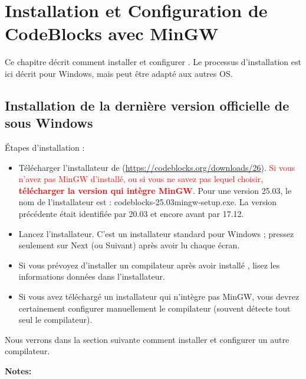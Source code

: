 ﻿\chapter{Installation et Configuration de CodeBlocks avec MinGW}\label{sec:install_codeblocks}

Ce chapitre décrit comment installer et configurer \codeblocks. Le processus d'installation est ici décrit pour Windows, mais peut être adapté aux autres OS.

\section{Installation de la dernière version officielle de \codeblocks sous Windows}
Étapes d'installation :
\begin{itemize}
\item Télécharger l'installateur de \codeblocks (\url{https://codeblocks.org/downloads/26}). \textcolor{red}{Si vous n'avez pas MinGW d'installé, ou si vous ne savez pas lequel choisir, \textbf{télécharger la version qui intègre MinGW}}. Pour une version 25.03, le nom de l'installateur est : codeblocks-25.03mingw-setup.exe. La version précédente était identifiée par 20.03 et encore avant par 17.12.
\item Lancez l'installateur. C'est un installateur standard pour Windows ; pressez seulement sur Next (ou Suivant) après avoir lu chaque écran.
\item Si vous prévoyez d'installer un compilateur après avoir installé \codeblocks, lisez les informations données dans l'installateur.
\item Si vous avez téléchargé un installateur qui n'intègre pas MinGW, vous devrez certainement configurer manuellement le compilateur (souvent \codeblocks détecte tout seul le compilateur).
\end{itemize}

Nous verrons dans la section suivante comment installer et configurer un autre compilateur.

\textbf{Notes:}

